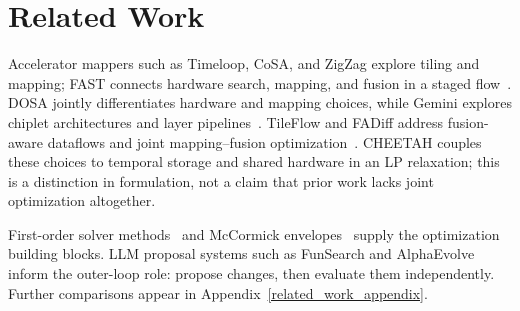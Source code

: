 \section{Related Work}
\label{sec:related}
Accelerator mappers such as Timeloop, CoSA, and ZigZag explore tiling and
mapping; FAST connects hardware search, mapping, and fusion in a staged
flow~\citep{timeloop,huang2021cosaschedulingconstrainedoptimization,mei2021zigzag,zhang_fast}.
DOSA jointly differentiates hardware and mapping choices, while Gemini explores
chiplet architectures and layer pipelines~\citep{hong2023dosa,cai2024gemini}.
TileFlow and FADiff address fusion-aware dataflows and joint mapping--fusion
optimization~\citep{zheng2023tileflow,jia2025fadifffusionawaredifferentiableoptimization}.
CHEETAH couples these choices to temporal storage and shared hardware in an LP
relaxation; this is a distinction in formulation, not a claim that prior work
lacks joint optimization altogether.

First-order solver methods~\citep{applegate2022practicallargescalelinearprogramming}
and McCormick envelopes~\citep{mccormick1976computability} supply the optimization
building blocks. LLM proposal systems such as FunSearch and
AlphaEvolve~\citep{romera2024mathematical,novikov2025alphaevolvecodingagentscientific}
inform the outer-loop role: propose changes, then evaluate them independently.
Further comparisons appear in Appendix~\ref{related_work_appendix}.
